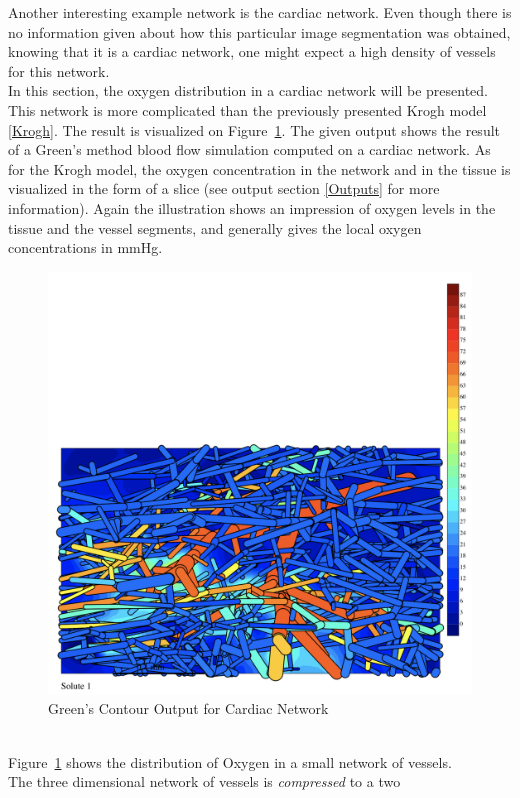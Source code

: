 Another interesting example network is the cardiac network. Even though there is no information given about how this particular image segmentation was obtained, knowing that it is a cardiac network, one might expect a high density of vessels for this network.
\\In this section, the oxygen distribution in a cardiac network will be presented. This network is more complicated than the previously presented Krogh model \ref{Krogh}. The result is visualized on Figure~\ref{fig:Contour_Cardiac1}. The given output shows the result of a Green's method blood flow simulation computed on a cardiac network. As for the Krogh model, the oxygen concentration in the network and in the tissue is visualized in the form of a slice (see output section \ref{Outputs} for more information). Again the illustration shows an impression of oxygen levels in the tissue and the vessel segments, and generally gives the local oxygen concentrations in mmHg.\\
\begin{figure}[h]
\centering
\includegraphics[width=120mm]{Contour_Cardiac}
\caption{\footnotesize Green's Contour Output for Cardiac Network}
\label{fig:Contour_Cardiac1}
\end{figure}
\\Figure~\ref{fig:Contour_Cardiac1} shows the distribution of Oxygen in a small
network of vessels.
\\The three dimensional network of vessels is \emph{compressed} to a two
